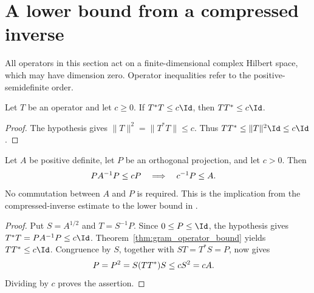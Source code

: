 \section{A lower bound from a compressed inverse}

All operators in this section act on a finite-dimensional complex
Hilbert space, which may have dimension zero. Operator inequalities
refer to the positive-semidefinite order.

\begin{theorem}
\label{thm:gram_operator_bound}
\leanok
Let $T$ be an operator and let $c\ge0$. If $T^*T\le c\Id$, then
$TT^*\le c\Id$.
\end{theorem}
\begin{proof}\leanok
The hypothesis gives $\|T\|^2=\|T^*T\|\le c$. Thus
$TT^*\le\|T\|^2\Id\le c\Id$.
\end{proof}

\begin{theorem}
\label{thm:inverse_compression_lower_pin}
\leanok
Let $A$ be positive definite, let $P$ be an orthogonal projection, and
let $c>0$. Then
\begin{align}
 PA^{-1}P\le cP \quad&\Longrightarrow\quad c^{-1}P\le A.\notag
\end{align}
No commutation between $A$ and $P$ is required. This is the implication
from the compressed-inverse estimate to the lower bound in
\cite[Section~8]{OpenAI2026AreaLaw}.
\end{theorem}
\begin{proof}\leanok
{}
Put $S=A^{1/2}$ and $T=S^{-1}P$. Since $0\le P\le\Id$, the hypothesis
gives $T^*T=PA^{-1}P\le c\Id$. Theorem~\ref{thm:gram_operator_bound}
yields $TT^*\le c\Id$. Congruence by $S$, together with
$ST=T^*S=P$, now gives
\begin{align}
 P=P^2=S(TT^*)S&\le cS^2=cA.\notag
\end{align}
Dividing by $c$ proves the assertion.
\end{proof}
